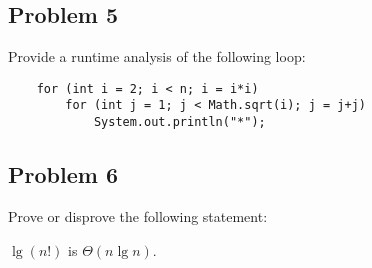 \subsection*{Problem 5}
Provide a runtime analysis of the following loop:

\begin{verbatim}
    for (int i = 2; i < n; i = i*i)
        for (int j = 1; j < Math.sqrt(i); j = j+j)
            System.out.println("*");
\end{verbatim}

\subsection*{Problem 6}
Prove or disprove the following statement:

\begin{center}
    $\lg(n!)$ is $\Theta(n\lg{n})$.
\end{center}

